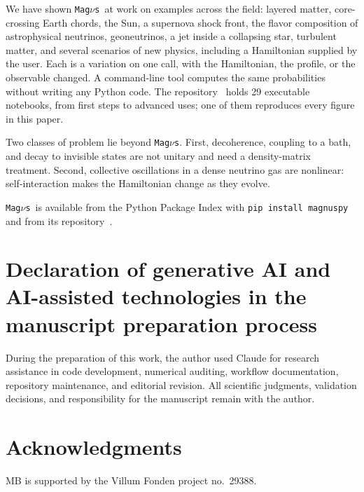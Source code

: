 \documentclass[final,5p,times,twocolumn,sort,compress]{elsarticle}
\makeatletter
\DeclareRobustCommand{\_}{%
  \ifmmode\nfss@text{\textunderscore}\else\textunderscore\allowbreak\fi}
\newcommand{\magnus}{{\tt Mag}\ensuremath{\nu}{\tt s}}
\makeatother
\begin{document}
We have shown \magnus\ at work on examples across the field: layered matter, core-crossing Earth chords, the Sun, a supernova shock front, the flavor composition of astrophysical neutrinos, geoneutrinos, a jet inside a collapsing star, turbulent matter, and several scenarios of new physics, including a Hamiltonian supplied by the user. Each is a variation on one call, with the Hamiltonian, the profile, or the observable changed. A command-line tool computes the same probabilities without writing any Python code. The repository~\cite{Magnus} holds 29 executable notebooks, from first steps to advanced uses; one of them reproduces every figure in this paper.

Two classes of problem lie beyond \magnus. First, decoherence, coupling to a bath, and decay to invisible states are not unitary and need a density-matrix treatment. Second, collective oscillations in a dense neutrino gas are nonlinear: self-interaction makes the Hamiltonian change as they evolve.

\magnus\ is available from the Python Package Index with {\tt pip install magnuspy} and from its repository\ \cite{Magnus}.

\section*{Declaration of generative AI and AI-assisted technologies in the manuscript preparation process}

During the preparation of this work, the author used Claude for research assistance in code development, numerical auditing, workflow documentation, repository maintenance, and editorial revision. All scientific judgments, validation decisions, and responsibility for the manuscript remain with the author.


\section*{Acknowledgments}

MB is supported by the {\sc Villum Fonden} project no.~29388.

\end{document}

